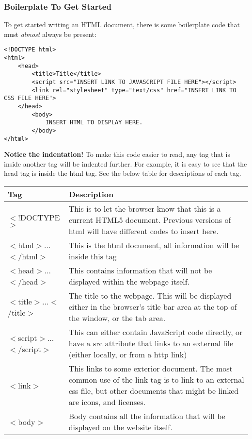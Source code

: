 \documentclass[12pt]{report}
\begin{document}
				\subsubsection{Boilerplate To Get Started}
				\label{html-boiler}
				To get started writing an HTML document, there is some boilerplate code that must \textit{almost} always be present:\\

					\begin{lstlisting}
<!DOCTYPE html>
<html>
	<head>
		<title>Title</title>
		<script src="INSERT LINK TO JAVASCRIPT FILE HERE"></script>
		<link rel="stylesheet" type="text/css" href="INSERT LINK TO CSS FILE HERE">
	</head>
		<body>
			INSERT HTML TO DISPLAY HERE.
		</body>
</html>
					\end{lstlisting}

						\vspace{0.5cm}
						\textbf{Notice the indentation!} To make this code easier to read, any tag that is inside another tag will be indented further. For example, it is easy to see that the head tag is inside the html tag. See the below table for descriptions of each tag.\\

					{\centering
						\begin{tabular}{P{4cm}p{11cm}}
						\toprule
						\large\textbf{Tag} & \large\textbf{Description}\\
						\toprule
						$<$!DOCTYPE$>$ & This is to let the browser know that this is a current HTML5 document. Previous versions of html will have different codes to insert here. \autocite{doctype} \\
						\hline
						$<$html$>$...$<$/html$>$ &  This is the html document, all information will be inside this tag\\
						\hline
						$<$head$>$...$<$/head$>$ &  This contains information that will not be displayed within the webpage itself.\\
						\hline
						$<$title$>$...$<$/title$>$ &  The title to the webpage. This will be displayed either in the browser's title bar area at the top of the window, or the tab area.\\
						\hline
						$<$script$>$...$<$/script$>$ & This can either contain JavaScript code directly, or have a src attribute that links to an external file (either locally, or from a http link) \\
						\hline
						$<$link$>$& This  links to some exterior document. The most common use of the link tag is to link to an external css file, but other documents that might be linked are icons, and licenses. \autocite{w3-link} \\
						\hline
						$<$body$>$& Body contains all the information that will be displayed on the website itself. \\
						\bottomrule
					\end{tabular}
				}
\end{document}
